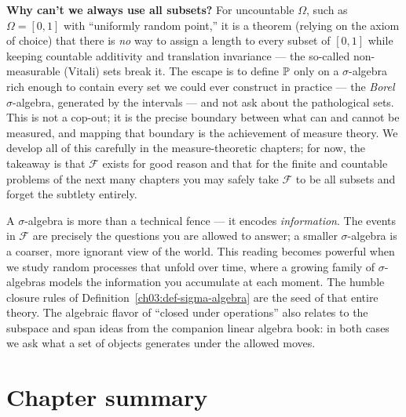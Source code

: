 \begin{formalbox}
\textbf{Why can't we always use all subsets?} For uncountable $\Omega$, such as
$\Omega = [0,1]$ with ``uniformly random point,'' it is a theorem (relying on the
axiom of choice) that there is \emph{no} way to assign a length to every subset of
$[0,1]$ while keeping countable additivity and translation invariance --- the
so-called non-measurable (Vitali) sets break it. The escape is to define $\P$
only on a $\sigma$-algebra rich enough to contain every set we could ever
construct in practice --- the \emph{Borel} $\sigma$-algebra, generated by the
intervals --- and not ask about the pathological sets. This is not a
cop-out; it is the precise boundary between what can and cannot be measured, and
mapping that boundary is the achievement of measure theory. We develop all of
this carefully in the measure-theoretic chapters; for now, the takeaway is that
$\mathcal{F}$ exists for good reason and that for the finite and countable
problems of the next many chapters you may safely take $\mathcal{F}$ to be all
subsets and forget the subtlety entirely.
\end{formalbox}

\begin{connectionbox}
A $\sigma$-algebra is more than a technical fence --- it encodes
\emph{information}. The events in $\mathcal{F}$ are precisely the questions you are
allowed to answer; a smaller $\sigma$-algebra is a coarser, more ignorant view of
the world. This reading becomes powerful when we study random processes that unfold over time, where a growing family of $\sigma$-algebras models the information you accumulate at each moment. The humble closure rules of
Definition~\ref{ch03:def-sigma-algebra} are the seed of that entire theory. The
algebraic flavor of ``closed under operations'' also relates to the subspace and
span ideas from the companion linear algebra book: in both cases we ask what a
set of objects generates under the allowed moves.
\end{connectionbox}

\section{Chapter summary}
\label{ch03:summary}

